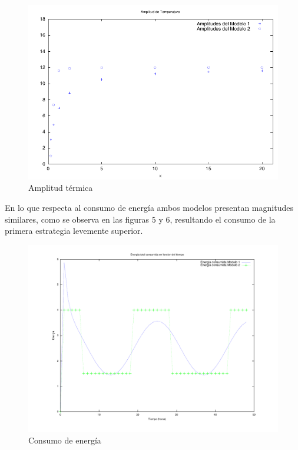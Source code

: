 \documentclass{sig-alternate}
\begin{document}
\begin{figure}[hp]
\label{amplitud_termica}
\centering
\includegraphics[scale=1.05]{graficos/amplitudes}
\caption{Amplitud t\'{e}rmica}
\end{figure}

En lo que respecta al consumo de energ\'{i}a ambos modelos presentan
magnitudes similares, como se observa en las fi\-gu\-ras $5$ y 
$6$, resultando el consumo de la primera estrategia
levemente superior.

\begin{figure}[hp]
\label{consumo_energia}
\centering
\includegraphics[scale=.8]{graficos/energia}
\caption{Consumo de energ\'{i}a}
\end{figure}
\end{document}
